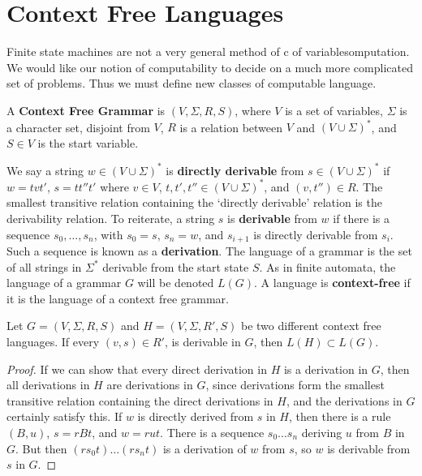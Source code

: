 \chapter{Context Free Languages}

Finite state machines are not a very general method of c of variablesomputation. We would like our notion of computability to decide on a much more complicated set of problems. Thus we must define new classes of computable language.

\begin{definition}
    A {\bf Context Free Grammar} is $(V,\Sigma,R,S)$, where $V$ is a set of variables, $\Sigma$ is a character set, disjoint from $V$, $R$ is a relation between $V$ and $(V \cup \Sigma)^*$, and $S \in V$ is the start variable.
\end{definition}

We say a string $w \in (V \cup \Sigma)^*$ is {\bf directly derivable} from $s \in (V \cup \Sigma)^*$ if $w = tvt'$, $s = tt''t'$ where $v \in V$, $t,t',t'' \in (V \cup \Sigma)^*$, and $(v,t'') \in R$. The smallest transitive relation containing the `directly derivable' relation is the derivability relation. To reiterate, a string $s$ is {\bf derivable} from $w$ if there is a sequence $s_0, \dots, s_n$, with $s_0 = s$, $s_n = w$, and $s_{i+1}$ is directly derivable from $s_i$. Such a sequence is known as a {\bf derivation}. The language of a grammar is the set of all strings in $\Sigma^*$ derivable from the start state $S$. As in finite automata, the language of a grammar $G$ will be denoted $L(G)$. A language is {\bf context-free} if it is the language of a context free grammar.

\begin{lemma}
    Let $G = (V,\Sigma,R,S)$ and $H = (V,\Sigma,R',S)$ be two different context free languages. If every $(v,s) \in R'$, is derivable in $G$, then $L(H) \subset L(G)$.
\end{lemma}
\begin{proof}
    If we can show that every direct derivation in $H$ is a derivation in $G$, then all derivations in $H$ are derivations in $G$, since derivations form the smallest transitive relation containing the direct derivations in $H$, and the derivations in $G$ certainly satisfy this. If $w$ is directly derived from $s$ in $H$, then there is a rule $(B,u)$, $s = rBt$, and $w = rut$. There is a sequence $s_0 \dots s_n$ deriving $u$ from $B$ in $G$. But then $(rs_0t) \dots (rs_nt)$ is a derivation of $w$ from $s$, so $w$ is derivable from $s$ in $G$.
\end{proof}

